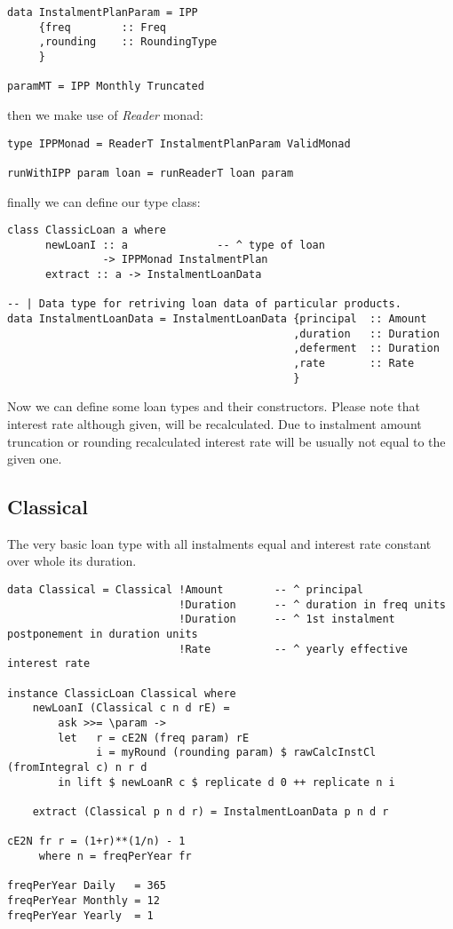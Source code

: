 \documentclass[letterpaper,11pt]{article}
\begin{document}
{\small
\begin{verbatim}
data InstalmentPlanParam = IPP
     {freq        :: Freq
     ,rounding    :: RoundingType
     }

paramMT = IPP Monthly Truncated
\end{verbatim}
}

then we make use of {\em Reader} monad:

{\small
\begin{verbatim}
type IPPMonad = ReaderT InstalmentPlanParam ValidMonad

runWithIPP param loan = runReaderT loan param
\end{verbatim}
}

finally we can define our type class:

{\small
\begin{verbatim}
class ClassicLoan a where
      newLoanI :: a              -- ^ type of loan
               -> IPPMonad InstalmentPlan
      extract :: a -> InstalmentLoanData

-- | Data type for retriving loan data of particular products.
data InstalmentLoanData = InstalmentLoanData {principal  :: Amount
                                             ,duration   :: Duration
                                             ,deferment  :: Duration
                                             ,rate       :: Rate
                                             }
\end{verbatim}
}

Now we can define some loan types and their constructors. Please note that interest rate although given, will be recalculated. Due to instalment amount truncation or rounding recalculated interest rate will be usually not equal to the given one.

\subsection{Classical}
The very basic loan type with all instalments equal and interest rate constant over whole its duration.

{\small
\begin{verbatim}
data Classical = Classical !Amount        -- ^ principal
                           !Duration      -- ^ duration in freq units
                           !Duration      -- ^ 1st instalment postponement in duration units
                           !Rate          -- ^ yearly effective interest rate

instance ClassicLoan Classical where
    newLoanI (Classical c n d rE) =
        ask >>= \param ->
        let   r = cE2N (freq param) rE
              i = myRound (rounding param) $ rawCalcInstCl (fromIntegral c) n r d
        in lift $ newLoanR c $ replicate d 0 ++ replicate n i

    extract (Classical p n d r) = InstalmentLoanData p n d r

cE2N fr r = (1+r)**(1/n) - 1
     where n = freqPerYear fr

freqPerYear Daily   = 365
freqPerYear Monthly = 12
freqPerYear Yearly  = 1
\end{verbatim}
}
\end{document}
